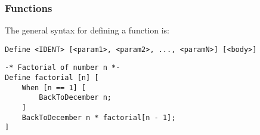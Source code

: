 \subsubsection{Functions}
The general syntax for defining a function is:
\begin{verbatim}
Define <IDENT> [<param1>, <param2>, ..., <paramN>] [<body>]
\end{verbatim}
\begin{verbatim}
-* Factorial of number n *-
Define factorial [n] [
    When [n == 1] [
        BackToDecember n;
    ]
    BackToDecember n * factorial[n - 1];
]
\end{verbatim}